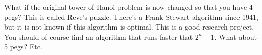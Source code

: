 What if the original tower of Hanoi problem is now changed so
that you have 4 pegs?
This is called Reve's puzzle. There's a Frank-Stewart algorithm since 1941,
but it is not known if this algorithm is optimal.
This is a good research project.
You should of course find an algorithm that runs faster that $2^n - 1$.
What about 5 pegs? Etc.
